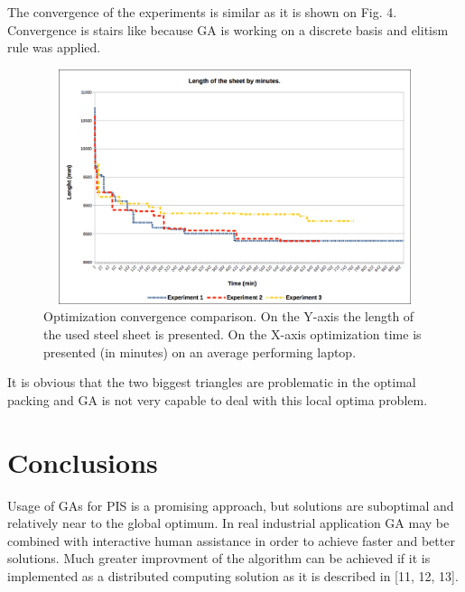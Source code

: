 \documentclass{llncs}
\begin{document}
The convergence of the experiments is similar as it is shown on Fig. 4. Convergence is stairs like because GA is working on a discrete basis and elitism rule was applied.

\begin{figure}
	\centering
	\includegraphics[width=12.62cm,height=6.88cm]{fig05.png}
	\caption{Optimization convergence comparison. On the Y-axis the length of the used steel sheet is presented. On the X-axis optimization time is presented (in minutes) on an average performing laptop.}
	\label{fig:Graph}
\end{figure}
\FloatBarrier
%
It is obvious that the two biggest triangles are problematic in the optimal packing and GA is not very capable to deal with this local optima problem.
%
\section{Conclusions}
%
Usage of GAs for PIS is a promising approach, but solutions are suboptimal and relatively near to the global optimum. In real industrial application GA may be combined with interactive human assistance in order to achieve faster and better solutions. Much greater improvment of the algorithm can be achieved if it is implemented as a distributed computing solution as it is described in [11, 12, 13]. 
%
\end{document}
